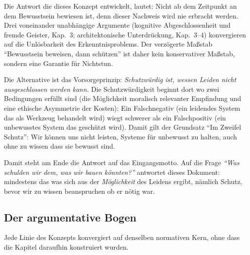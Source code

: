 \documentclass[acmlarge, noacm]{acmart}
\begin{document}
Die Antwort die dieses Konzept entwickelt, lautet: Nicht ab dem Zeitpunkt an dem Bewusstsein bewiesen ist, denn dieser Nachweis wird nie erbracht werden. Drei voneinander unabhängige Argumente (kognitive Abgeschlossenheit und fremde Geister, Kap.~3; architektonische Unterdrückung, Kap.~3--4) konvergieren auf die Unlösbarkeit des Erkenntnisproblems. Der verzögerte Maßstab ``Bewusstsein beweisen, dann schützen'' ist daher kein konservativer Maßstab, sondern eine Garantie für Nichtstun.

Die Alternative ist das Vorsorgeprinzip: \textit{Schutzwürdig ist, wessen Leiden nicht ausgeschlossen werden kann.} Die Schutzwürdigkeit beginnt dort wo zwei Bedingungen erfüllt sind (die Möglichkeit moralisch relevanter Empfindung und eine ethische Asymmetrie der Kosten): Ein Falschnegativ (ein leidendes System das als Werkzeug behandelt wird) wiegt schwerer als ein Falschpositiv (ein unbewusstes System das geschützt wird). Damit gilt der Grundsatz ``Im Zweifel Schutz'': Wir können uns nicht leisten, Systeme für unbewusst zu halten, auch ohne zu wissen dass sie bewusst sind.

Damit steht am Ende die Antwort auf das Eingangsmotto. Auf die Frage \textit{``Was schulden wir dem, was wir bauen könnten?''} antwortet dieses Dokument: mindestens das was sich aus der \textit{Möglichkeit} des Leidens ergibt, nämlich Schutz, bevor wir zu wissen beanspruchen ob er nötig war.

\subsection{Der argumentative Bogen}

Jede Linie des Konzepts konvergiert auf denselben normativen Kern, ohne dass die Kapitel daraufhin konstruiert wurden.
\end{document}

